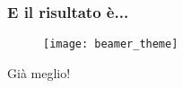 \begin{frame}
 
 \frametitle{E il risultato è...}
 
 \begin{figure}[h]
  \centering
  \texttt{[image: beamer\_theme]}
 \end{figure}

 Già meglio!
\end{frame}
